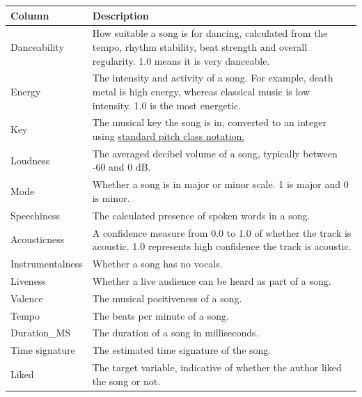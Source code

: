 \documentclass[12pt]{report}
\begin{document}
\begin{table}[H]
    \centering
        \begin{tabular}{ |p{} | p{}|}
            \hline
            \cellcolor{blue!25}Column & \cellcolor{blue!25}Description\\
            \hline
            Danceability & How suitable a song is for dancing, calculated from the tempo, rhythm stability, beat strength and overall regularity. 1.0 means it is very danceable. \\
            \hline
            Energy & The intensity and activity of a song. For example, death metal is high energy, whereas classical music is low intensity. 1.0 is the most energetic.\\
            \hline
            Key & The musical key the song is in, converted to an integer using \href{https://smbutterfield.github.io/ibmt17-18/22-intro-to-non-diatonic-materials/b2-tx-pcintnotation.html}{standard pitch class notation.}\autocite{butterfield_22b_nodate} \\
            \hline
            Loudness & The averaged decibel volume of a song, typically between -60 and 0 dB.\\
            \hline
            Mode & Whether a song is in major or minor scale. 1 is major and 0 is minor.\\
            \hline
            Speechiness & The calculated presence of spoken words in a song.\\
            \hline
            Acousticness & A confidence measure from 0.0 to 1.0 of whether the track is acoustic. 1.0 represents high confidence the track is acoustic.\\
            \hline
            Instrumentalness & Whether a song has no vocals.\\
            \hline
            Liveness & Whether a live audience can be heard as part of a song.\\
            \hline
            Valence & The musical positiveness of a song.\\
            \hline
            Tempo & The beats per minute of a song.\\
            \hline
            Duration\_MS & The duration of a song in milliseconds.\\
            \hline
            Time signature & The estimated time signature of the song.\\
            \hline
            \cellcolor{red!15}Liked & The target variable, indicative of whether the author liked the song or not.\\

\end{tabular}
\end{table}
\end{document}
